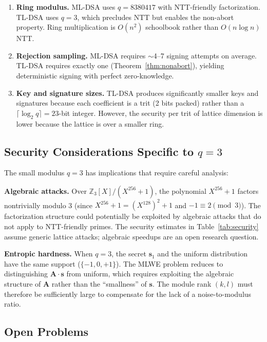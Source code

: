 \documentclass[11pt,a4paper]{article}
\theoremstyle{definition}
\newcommand{\Z}{\mathbb{Z}}
\begin{document}
\begin{enumerate}[leftmargin=2em]
\item \textbf{Ring modulus.} ML-DSA uses $q = 8380417$ with NTT-friendly factorization. TL-DSA uses $q = 3$, which precludes NTT but enables the non-abort property. Ring multiplication is $O(n^2)$ schoolbook rather than $O(n \log n)$ NTT.

\item \textbf{Rejection sampling.} ML-DSA requires $\sim$4--7 signing attempts on average. TL-DSA requires exactly one (Theorem~\ref{thm:nonabort}), yielding deterministic signing with perfect zero-knowledge.

\item \textbf{Key and signature sizes.} TL-DSA produces significantly smaller keys and signatures because each coefficient is a trit (2 bits packed) rather than a $\lceil \log_2 q \rceil = 23$-bit integer. However, the security per trit of lattice dimension is lower because the lattice is over a smaller ring.
\end{enumerate}

\subsection{Security Considerations Specific to $q=3$}

The small modulus $q=3$ has implications that require careful analysis:

\textbf{Algebraic attacks.} Over $\Z_3[X]/(X^{256}+1)$, the polynomial $X^{256}+1$ factors nontrivially modulo 3 (since $X^{256}+1 = (X^{128})^2 + 1$ and $-1 \equiv 2 \pmod{3}$). The factorization structure could potentially be exploited by algebraic attacks that do not apply to NTT-friendly primes. The security estimates in Table~\ref{tab:security} assume generic lattice attacks; algebraic speedups are an open research question.

\textbf{Entropic hardness.} When $q=3$, the secret $\mathbf{s}_1$ and the uniform distribution have the same support ($\{-1,0,+1\}$). The MLWE problem reduces to distinguishing $\mathbf{A} \cdot \mathbf{s}$ from uniform, which requires exploiting the algebraic structure of $\mathbf{A}$ rather than the ``smallness'' of $\mathbf{s}$. The module rank $(k, l)$ must therefore be sufficiently large to compensate for the lack of a noise-to-modulus ratio.

\subsection{Open Problems}
\end{document}
